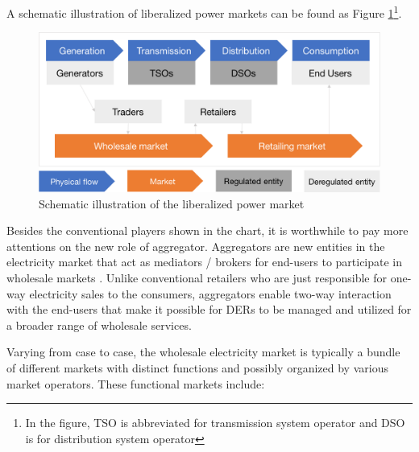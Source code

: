 A schematic illustration of liberalized power markets can be found as Figure \ref{fig:PowerMarketSchematic}\footnote{In the figure, TSO is abbreviated for transmission system operator and DSO is for distribution system operator}.

\begin{figure}[h!]
	\centering
	\includegraphics[width=0.95\linewidth]{Figures/PowerMarketSchematic}
	\caption{Schematic illustration of the liberalized power market}
	\label{fig:PowerMarketSchematic}
\end{figure}

Besides the conventional players shown in the chart, it is worthwhile to pay more attentions on the new role of aggregator. Aggregators are new entities in the electricity market that act as mediators / brokers for end-users to participate in wholesale markets \cite{He2011,Gkatzikis2013,Rahnama2014,HenriquezAuba2017,Lipari2017}. Unlike conventional retailers who are just responsible for one-way electricity sales to the consumers, aggregators enable two-way interaction with the end-users that make it possible for DERs to be managed and utilized for a broader range of wholesale services. 
 
Varying from case to case, the wholesale electricity market is typically a bundle of different markets with distinct functions and possibly organized by various market operators. These functional markets include:

